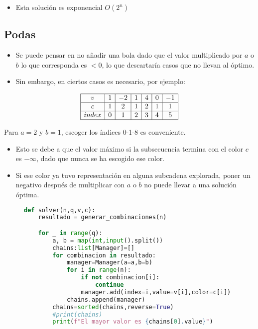 \documentclass{article}
\begin{document}
\begin{itemize}
    \item Esta solución es exponencial $O(2^n)$
\end{itemize}

\subsection{Podas}
\begin{itemize}
    \item Se puede pensar en no añadir una bola dado que el valor multiplicado por $a$ o $b$ lo que corresponda es $< 0$, lo que descartaría casos que no llevan al óptimo.
    \item Sin embargo, en ciertos casos es necesario, por ejemplo:
\end{itemize}

\[
\begin{array}{|c|c|c|c|c|c|c|}
\hline
v & 1 & -2 & 1 & 4 & 0 & -1 \\
\hline
c & 1 & 2 & 1 & 2 & 1 & 1 \\
\hline
index & 0 & 1 & 2 & 3 & 4 & 5 \\
\hline
\end{array}
\]

Para $a=2$ y $b=1$, escoger los índices 0-1-8 es conveniente.
\begin{itemize}
    \item Esto se debe a que el valor máximo si la subsecuencia termina con el color $c$ es $-\infty$, dado que nunca se ha escogido ese color.
    \item Si ese color ya tuvo representación en alguna subcadena explorada, poner un negativo después de multiplicar con $a$ o $b$ no puede llevar a una solución óptima.
\end{itemize}
\begin{figure}[H]
    \centering

\begin{lstlisting}[language=Python]
    def solver(n,q,v,c):
    resultado = generar_combinaciones(n)

    for _ in range(q):
        a, b = map(int,input().split())
        chains:list[Manager]=[]
        for combinacion in resultado:
            manager=Manager(a=a,b=b)
            for i in range(n):
                if not combinacion[i]:
                    continue
                manager.add(index=i,value=v[i],color=c[i])
            chains.append(manager)
        chains=sorted(chains,reverse=True)
        #print(chains)
        print(f"El mayor valor es {chains[0].value}")
    \end{lstlisting}
\end{figure}
\end{document}
